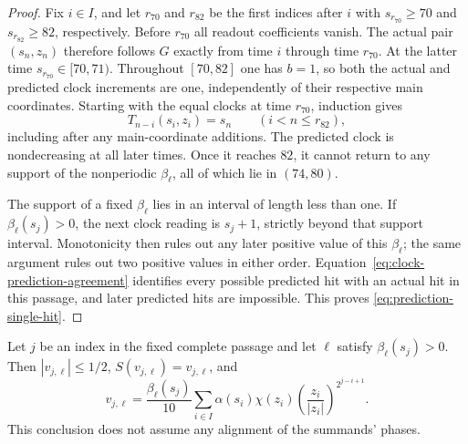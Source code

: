 \begin{proof}
Fix $i\in I$, and let $r_{70}$ and $r_{82}$ be the first indices after $i$
with $s_{r_{70}}\ge70$ and $s_{r_{82}}\ge82$, respectively.  Before
$r_{70}$ all readout coefficients vanish.  The actual pair $(s_n,z_n)$
therefore follows $G$ exactly from time $i$ through time $r_{70}$.
At the latter time $s_{r_{70}}\in[70,71)$.  Throughout $[70,82]$ one has
$b=1$, so both the actual and predicted clock increments are one,
independently of their respective main coordinates.  Starting with the
equal clocks at time $r_{70}$, induction gives
\begin{equation}\label{eq:clock-prediction-agreement}
 T_{n-i}(s_i,z_i)=s_n\qquad(i<n\le r_{82}),
\end{equation}
including after any main-coordinate additions.  The predicted clock is
nondecreasing at all later times.  Once it reaches $82$, it cannot return
to any support of the nonperiodic $\beta_\ell$, all of which lie in $(74,80)$.

The support of a fixed $\beta_\ell$ lies in an interval of length less than
one.  If $\beta_\ell(s_j)>0$, the next clock reading is $s_j+1$, strictly
beyond that support interval.  Monotonicity then rules out any later
positive value of this $\beta_\ell$; the same argument rules out two positive
values in either order.  Equation~\eqref{eq:clock-prediction-agreement}
identifies every possible predicted hit with an actual hit in this
passage, and later predicted hits are impossible.  This proves
\eqref{eq:prediction-single-hit}.
\end{proof}

\begin{lemma}\label{lem:register-linearity}
Let $j$ be an index in the fixed complete passage and let $\ell$ satisfy
$\beta_\ell(s_j)>0$.  Then $|v_{j,\ell}|\le1/2$, $S(v_{j,\ell})=v_{j,\ell}$, and
\begin{equation}\label{eq:register-at-readout}
 v_{j,\ell}=\frac{\beta_\ell(s_j)}{10}
 \sum_{i\in I}\alpha(s_i)\chi(z_i)
 \left(\frac{z_i}{|z_i|}\right)^{2^{j-i+1}}.
\end{equation}
This conclusion does not assume any alignment of the summands' phases.
\end{lemma}

